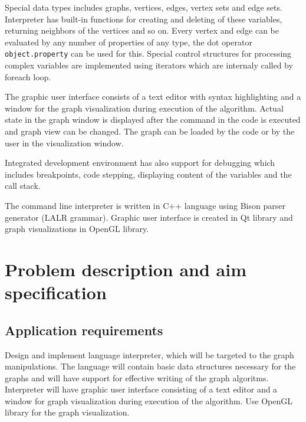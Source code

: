 \documentclass[11pt,twoside,a4paper]{book}
\begin{document}
Special data types includes graphs, vertices, edges, vertex sets and edge sets. Interpreter has built-in functions for creating and deleting of these variables, returning neighbors of the vertices and so on. Every vertex and edge can be evaluated by any number of properties of any type, the dot operator \texttt{object.property} can be used for this. Special control structures for processing complex variables are implemented using iterators which are internaly called by foreach loop.

The graphic user interface consists of a text editor with syntax highlighting and a window for the graph visualization during execution of the algorithm. Actual state in the graph window is displayed after the command in the code is executed and graph view can be changed. The graph can be loaded by the code or by the user in the visualization window.

Integrated development environment has also support for debugging which includes breakpoints, code stepping, displaying content of the variables and the call stack.

The command line interpreter is written in C++ language using Bison parser generator (LALR grammar). Graphic user interface is created in Qt library and graph visualizations in OpenGL library.



\chapter{Problem description and aim specification}



\section{Application requirements}

Design and implement language interpreter, which will be targeted to the graph manipulations. The language will contain basic data structures necessary for the graphs and will have support for effective writing of the graph algoritms. Interpreter will have graphic user interface consisting of a text editor and a window for graph visualization during execution of the algorithm. Use OpenGL library for the graph visualization.
\end{document}
